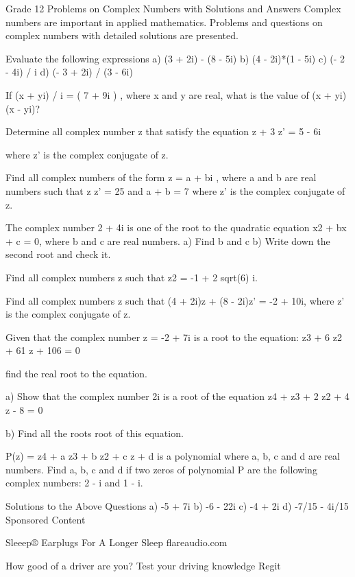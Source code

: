 

Grade 12 Problems on Complex Numbers with Solutions and Answers
Complex numbers are important in applied mathematics. Problems and questions on complex numbers with detailed solutions are presented. 



Evaluate the following expressions 
a) (3 + 2i) - (8 - 5i) 
b) (4 - 2i)*(1 - 5i) 
c) (- 2 - 4i) / i 
d) (- 3 + 2i) / (3 - 6i) 


If (x + yi) / i = ( 7 + 9i ) , where x and y are real, what is the value of (x + yi)(x - yi)? 


Determine all complex number z that satisfy the equation 
z + 3 z' = 5 - 6i

where z' is the complex conjugate of z. 

Find all complex numbers of the form z = a + bi , where a and b are real numbers such that z z' = 25 and a + b = 7 
where z' is the complex conjugate of z. 


The complex number 2 + 4i is one of the root to the quadratic equation x2 + bx + c = 0, where b and c are real numbers. 
a) Find b and c 
b) Write down the second root and check it. 

Find all complex numbers z such that z2 = -1 + 2 sqrt(6) i. 

Find all complex numbers z such that (4 + 2i)z + (8 - 2i)z' = -2 + 10i, where z' is the complex conjugate of z. 


Given that the complex number z = -2 + 7i is a root to the equation: 
z3 + 6 z2 + 61 z + 106 = 0 

find the real root to the equation. 

a) Show that the complex number 2i is a root of the equation 
z4 + z3 + 2 z2 + 4 z - 8 = 0 

b) Find all the roots root of this equation. 

P(z) = z4 + a z3 + b z2 + c z + d is a polynomial where a, b, c and d are real numbers. Find a, b, c and d if two zeros of polynomial P are the following complex numbers: 2 - i and 1 - i. 


Solutions to the Above Questions
a) -5 + 7i 
b) -6 - 22i 
c) -4 + 2i 
d) -7/15 - 4i/15 
Sponsored Content


Sleeep® Earplugs For A Longer Sleep
flareaudio.com


How good of a driver are you? Test your driving knowledge
Regit



